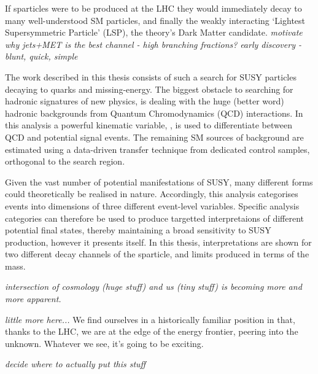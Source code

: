 If sparticles were to be produced at the LHC they would immediately decay to
many well-understood SM particles, and finally the weakly interacting `Lightest
Supersymmetric Particle' (LSP), the theory's Dark Matter candidate.
\emph{motivate why jets+MET is the best channel - high branching fractions?}
\emph{early discovery - blunt, quick, simple}

The work described in this thesis consists of such a search for SUSY particles
decaying to quarks and missing-energy. The biggest obstacle to
searching for hadronic signatures of new physics, is dealing with the huge
(better word) hadronic backgrounds from Quantum Chromodynamics (QCD)
interactions. In this
analysis a powerful kinematic variable, \alphat, is used to differentiate
between QCD and potential signal events. The remaining SM sources of background
are estimated using a data-driven transfer technique from dedicated control
samples, orthogonal to the search region.

Given the vast number of potential manifestations of SUSY, many different forms
could theoretically be realised in nature. Accordingly, this analysis
categorises events into dimensions of three different event-level variables.
Specific analysis categories can therefore be used to produce targetted
interpretaions of different potential final states, thereby maintaining a broad
sensitivity to SUSY production, however it presents itself. In this thesis,
interpretations are shown for two different decay channels of the \sTop
sparticle, and limits produced in terms of the \sTop mass.


\emph{intersection of cosmology (huge stuff) and us (tiny stuff) is becoming more
and
more apparent.}

\emph{little more here...}
We find ourselves in a historically familiar position in that, thanks to the
LHC, we are at the edge of the energy frontier, peering into the unknown.
Whatever we see, it's going to be exciting.




\emph{decide where to actually put this stuff}

